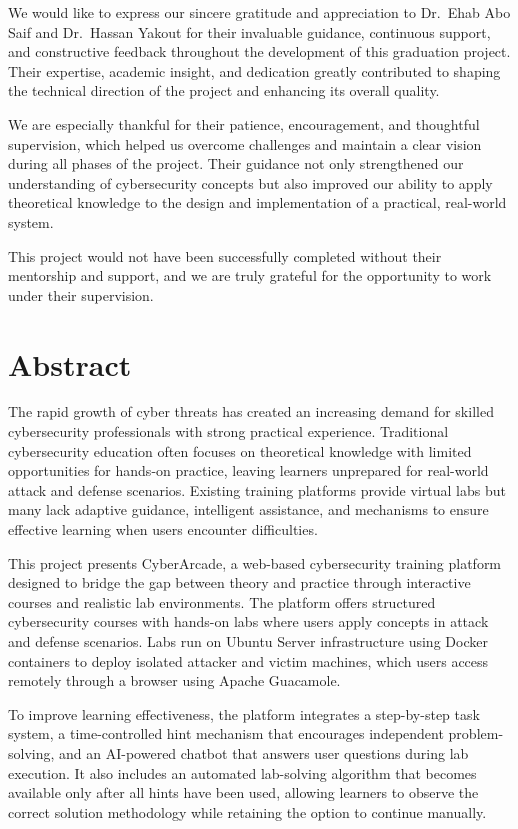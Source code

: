 \documentclass[12pt,a4paper]{report}
\begin{document}
We would like to express our sincere gratitude and appreciation to Dr.\ Ehab Abo Saif and
Dr.\ Hassan Yakout for their invaluable guidance, continuous support, and constructive feedback
throughout the development of this graduation project. Their expertise, academic insight, and
dedication greatly contributed to shaping the technical direction of the project and enhancing its
overall quality.

We are especially thankful for their patience, encouragement, and thoughtful supervision, which helped
us overcome challenges and maintain a clear vision during all phases of the project. Their guidance not
only strengthened our understanding of cybersecurity concepts but also improved our ability to apply
theoretical knowledge to the design and implementation of a practical, real-world system.

This project would not have been successfully completed without their mentorship and support, and we
are truly grateful for the opportunity to work under their supervision.
\clearpage

\chapter*{Abstract}

The rapid growth of cyber threats has created an increasing demand for skilled cybersecurity
professionals with strong practical experience. Traditional cybersecurity education often focuses on
theoretical knowledge with limited opportunities for hands-on practice, leaving learners unprepared
for real-world attack and defense scenarios. Existing training platforms provide virtual labs but many
lack adaptive guidance, intelligent assistance, and mechanisms to ensure effective learning when users
encounter difficulties.

This project presents CyberArcade, a web-based cybersecurity training platform designed to bridge the
gap between theory and practice through interactive courses and realistic lab environments. The
platform offers structured cybersecurity courses with hands-on labs where users apply concepts in
attack and defense scenarios. Labs run on Ubuntu Server infrastructure using Docker containers to
deploy isolated attacker and victim machines, which users access remotely through a browser using
Apache Guacamole.

To improve learning effectiveness, the platform integrates a step-by-step task system, a
time-controlled hint mechanism that encourages independent problem-solving, and an AI-powered chatbot
that answers user questions during lab execution. It also includes an automated lab-solving algorithm
that becomes available only after all hints have been used, allowing learners to observe the correct
solution methodology while retaining the option to continue manually.
\end{document}
